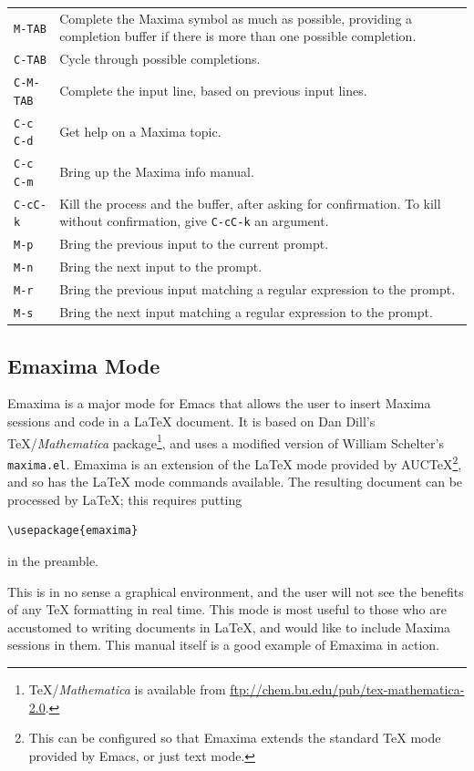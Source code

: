 \begin{tabular}{p{\firstcol}p{\secondcol}}
\texttt{M-TAB} & Complete the Maxima symbol as much as possible, providing
     a completion buffer if there is more than one possible completion.\\
\texttt{C-TAB} & Cycle through possible completions.\\
\texttt{C-M-TAB} & Complete the input line, based on previous input lines.\\
\texttt{C-c C-d} & Get help on a Maxima topic.\\
\texttt{C-c C-m} & Bring up the Maxima info manual.\\
\texttt{C-cC-k} & Kill the process and the buffer, after asking for
  confirmation.  To kill without confirmation, give \texttt{C-cC-k} an
  argument.\\
\texttt{M-p} & Bring the previous input to the current prompt.\\
\texttt{M-n} & Bring the next input to the prompt.\\
\texttt{M-r} & Bring the previous input matching
  a regular expression to the prompt.\\
\texttt{M-s} & Bring the next input matching
  a regular expression to the prompt.
\end{tabular}


\subsection{Emaxima Mode}

Emaxima is a major mode for Emacs that allows the user to insert Maxima
sessions and code in a \LaTeX{} document.  It is based on Dan Dill's
\TeX{}/\textit{Mathematica} package\footnote{\TeX/\textit{Mathematica} is
available from \url{ftp://chem.bu.edu/pub/tex-mathematica-2.0}.}, and
uses a modified version of William Schelter's \texttt{maxima.el}.
Emaxima is an extension of the
\LaTeX{} mode provided by AUC\TeX{}\footnote{This can be configured so
that Emaxima extends the standard \TeX{} mode provided by Emacs, or just
text mode.}, and so has the \LaTeX{} mode commands available.  The
resulting document can be processed by \LaTeX{}; this requires putting 
\begin{verbatim}
\usepackage{emaxima}
\end{verbatim}
\noindent
in the preamble.

This is in no sense a graphical environment, and the user will not see
the benefits of any TeX formatting in real time.  This mode is most 
useful to those who are accustomed to writing documents in LaTeX,
and would like to include Maxima sessions in them.  This manual itself
is a good example of Emaxima in action.

